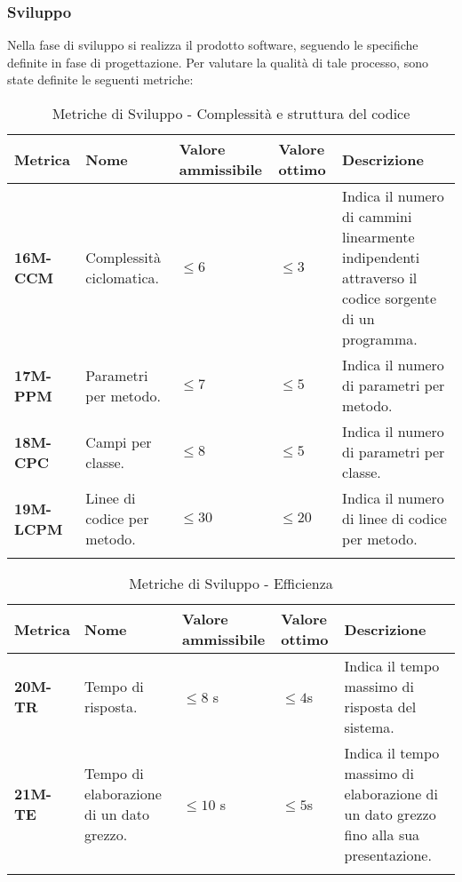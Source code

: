 \subsubsection{Sviluppo}
Nella fase di sviluppo si realizza il prodotto software, seguendo le specifiche definite in fase di progettazione.
Per valutare la qualità di tale processo, sono state definite le seguenti metriche:
\begin{longtable}{|>{\raggedright\arraybackslash}m{}|>{\raggedright\arraybackslash}m{}|>{\raggedright\arraybackslash}m{}|>{\raggedright\arraybackslash}m{}|>{\raggedright\arraybackslash}m{}|}
	\hline
	\textbf{Metrica} & \textbf{Nome} & \textbf{Valore ammissibile} & \textbf{Valore ottimo} & \textbf{Descrizione}\\
	\hline
	\endhead
	\textbf{16M-CCM} & Complessità ciclomatica. & $\leq 6$ & $\leq 3$ & Indica il numero di cammini linearmente indipendenti attraverso il codice sorgente di un programma. \\
	\hline
	\textbf{17M-PPM} & Parametri per metodo. & $\leq 7$ & $\leq 5$ & Indica il numero di parametri per metodo.\\
	\hline
	\textbf{18M-CPC} & Campi per classe. & $\leq 8$ & $\leq 5$ & Indica il numero di parametri per classe.\\
	\hline
	\textbf{19M-LCPM} & Linee di codice per metodo. & $\leq 30$ & $\leq 20$ & Indica il numero di linee di codice per metodo.\\
	\hline
	\caption{Metriche di Sviluppo - Complessità e struttura del codice}
	\label{table:5}
\end{longtable}

\newpage
{}
\begin{longtable}{|>{\raggedright\arraybackslash}m{}|>{\raggedright\arraybackslash}m{}|>{\raggedright\arraybackslash}m{}|>{\raggedright\arraybackslash}m{}|>{\raggedright\arraybackslash}m{}|}
	\hline
	\textbf{Metrica} & \textbf{Nome} & \textbf{Valore ammissibile} & \textbf{Valore ottimo} & \textbf{Descrizione}\\
	\hline
	\endhead
	\textbf{20M-TR} & Tempo di risposta. & $\leq 8$ s & $\leq 4$s & Indica il tempo massimo di risposta del sistema.\\
	\hline
	\textbf{21M-TE} & Tempo di elaborazione di un dato grezzo. & $\leq 10$ s & $\leq 5$s & Indica il tempo massimo di elaborazione di un dato grezzo fino alla sua presentazione. \\
	\hline
	\caption{Metriche di Sviluppo - Efficienza}
	\label{table:6}
\end{longtable}


